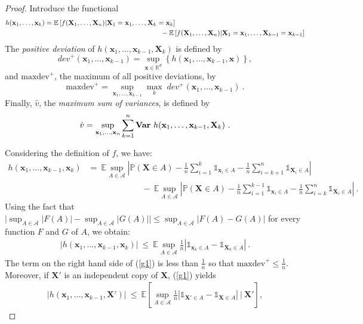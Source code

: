 \begin{proof}
Introduce the functional
\begin{align*}
&h(\mathbf{x}_1,\ldots,\mathbf{x}_k) = \mathbb{E}\left [ f(\mathbf X_1,\ldots, \mathbf X_n) | \mathbf{X}_1=\mathbf{x}_1,\ldots,\mathbf{X}_k=\mathbf{x}_k \right] \\ 
&~~~~~~~~~~~~~~~~~~~~~~~~~~~~~~~~~~~~~~~~~~~~~~~~~~~~~~~~~~~~~~~~~~~~- \mathbb{E}\left [ f(\mathbf X_1,\ldots, \mathbf X_n) | \mathbf{X}_1=\mathbf{x}_1,\ldots,\mathbf{X}_{k-1}=\mathbf{x}_{k-1} \right]
\end{align*}
The \emph{positive deviation} of
$h(\mathbf{x}_1,\ldots,\mathbf{x}_{k-1},\mathbf{X}_k)$ is defined by 
\[dev^+(\mathbf{x}_1,\ldots,\mathbf{x}_{k-1})= \sup_{\mathbf{x} \in
  \mathbb{R}^d} \left \{
  h(\mathbf{x}_1,\ldots,\mathbf{x}_{k-1},\mathbf{x})\right \}, \]
 and $\text{maxdev}^+$, the maximum of all positive deviations, by 
 \[\text{maxdev}^+ = \sup_{\mathbf{x}_1,\ldots,\mathbf{x}_{k-1}} \max_{k}\;
 dev^+(\mathbf{x}_1,\ldots,\mathbf{x}_{k-1})~.\] %
 Finally,  $\hat v $, the \emph{maximum sum of
 variances}, is defined by $$\hat v = \sup_{\mathbf{x}_1,\ldots,\mathbf{x}_n}
 \sum_{k=1}^{n} \mathbf{Var}~ h(\mathbf{x}_1,\ldots,\mathbf{x}_{k-1}, \mathbf X_k)~.$$

Considering the definition of $f$, we have:
\begin{align*}
h(\mathbf{x}_1,\ldots,\mathbf{x}_{k-1},\mathbf{x}_k) &= ~\mathbb{E} \sup_{A \in \mathcal{A} } \left | \mathbb{P}(\mathbf{X} \in A) - \frac{1}{n} \sum_{i=1}^k \mathds{1}_{\mathbf{x}_i \in A} - \frac{1}{n} \sum_{i=k+1}^n \mathds{1}_{\mathbf{X}_i \in A}  \right|  \\ 
&~~~~~~~~~~~~~~~~~~~~~~~~~~~~~-~ \mathbb{E} \sup_{A \in \mathcal{A} } \left | \mathbb{P}(\mathbf{X} \in A) - \frac{1}{n} \sum_{i=1}^{k-1} \mathds{1}_{\mathbf{x}_i \in A} - \frac{1}{n} \sum_{i=k}^n \mathds{1}_{\mathbf{X}_i \in A}  \right|~. 
\end{align*}
Using the fact that $\big | \sup_{A \in \mathcal{A}}|F(A)| - \sup_{A \in \mathcal{A}}|G(A)| \big| \le \sup_{A \in \mathcal{A}} |F(A) - G(A)|$ for every function $F$ and $G$ of $A$, we obtain:
\begin{align}
\label{g1}
\big| h(\mathbf{x}_1,\ldots,\mathbf{x}_{k-1},\mathbf{x}_k) \big| ~\le~ \mathbb{E}  \sup_{A \in \mathcal{A}} \frac{1}{n} \left | \mathds{1}_{\mathbf{x}_k \in A} - \mathds{1}_{\mathbf{X}_k \in A}  \right|~.
\end{align}
\noindent
The term on the right hand side of (\ref{g1}) is less than $\frac{1}{n}$ so that $\text{maxdev}^+ \le \frac{1}{n}$. Moreover, if $\mathbf{X}'$ is an independent copy of $\mathbf{X}$, (\ref{g1}) yields  
\begin{align*}
\big| h(\mathbf{x}_1,\ldots,\mathbf{x}_{k-1},\mathbf{X}') \big| ~\le~ \mathbb{E} \left [  \sup_{A \in \mathcal{A}} \frac{1}{n} \left | \mathds{1}_{\mathbf{X}' \in A} - \mathds{1}_{\mathbf{X} \in A}  \right| ~\Big|~ \mathbf{X}' \right],
\end{align*}


\end{proof}
